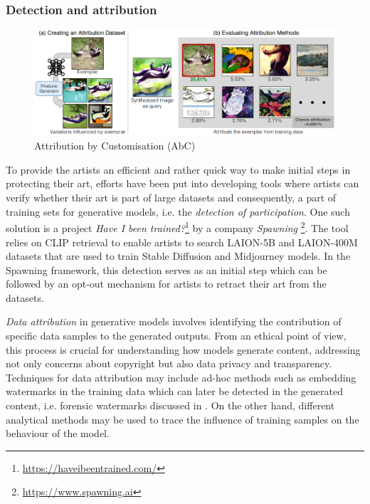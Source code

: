 \documentclass[conference]{IEEEtran}
\begin{document}
\subsubsection{Detection and attribution}\label{sec:mitigation-detection}
\begin{figure}
    \centering
    \includegraphics[width=\linewidth]{figures/attribution.PNG}
    \caption{Attribution by Customisation (AbC)~\cite{wang_evaluating_2023}}
    \label{fig:attribution}
\end{figure}

To provide the artists an efficient and rather quick way to make initial steps in protecting their art, efforts have been put into developing tools where artists can verify whether their art is part of large datasets and consequently, a part of training sets for generative models, i.e. the \textit{detection of participation}. 
One such solution is a project \textit{Have I been trained?}\footnote{\url{https://haveibeentrained.com/}} %
by a company \textit{Spawning} \footnote{\url{https://www.spawning.ai}}. %
The tool relies on CLIP retrieval to enable artists to search LAION-5B and LAION-400M datasets that are used to train Stable Diffusion and Midjourney models. 
In the Spawning framework, this detection serves as an initial step which can be followed by an opt-out mechanism for artists to retract their art from the datasets. 

\textit{Data attribution} in generative models involves identifying the contribution of specific data samples to the generated outputs. 
From an ethical point of view, this process is crucial for understanding how models generate content, addressing not only concerns about copyright but also data privacy and transparency. 
Techniques for data attribution may include ad-hoc methods such as embedding watermarks in the training data which can later be detected in the generated content, i.e. forensic watermarks discussed in . 
On the other hand, different analytical methods may be used to trace the influence of training samples on the behaviour of the model. 
\end{document}
